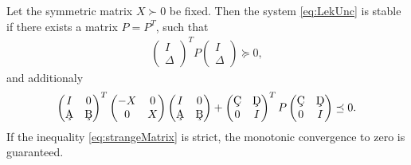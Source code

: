 \begin{theo}
	\label{thm:stabViaP}
	Let the symmetric matrix $X \succ 0 $ be fixed.
	Then the system \eqref{eq:LekUnc} is stable if there exists a matrix $P = P^T$, such that 
	\begin{align}
	\label{eq:PDelta}
	\begin{pmatrix}
	I \\ \Delta
	\end{pmatrix}^T 
	P
	\begin{pmatrix}
	I \\ \Delta
	\end{pmatrix} \succeq 0, 
	\end{align}
	and additionaly 
	\begin{align}
	\label{eq:strangeMatrix}
	\begin{pmatrix}
	I & 0 \\ \c{A} &  \c{B}
	\end{pmatrix}^T\begin{pmatrix}
	-X & 0 \\ 0 & X
	\end{pmatrix} 
	\begin{pmatrix}
	I & 0 \\ \c{A} &  \c{B}
	\end{pmatrix} + 
	\begin{pmatrix}
	\c{C} & \c{D} \\ 0 & I
	\end{pmatrix}^T
	P
	\begin{pmatrix}
	\c{C} & \c{D} \\ 0 & I
	\end{pmatrix} \preceq 0.
	\end{align}
	If the inequality \eqref{eq:strangeMatrix} is strict, the monotonic convergence to zero is guaranteed. 
\end{theo}
